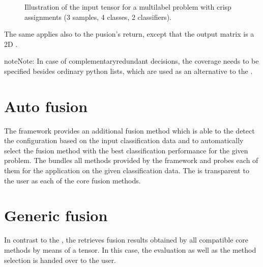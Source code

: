 \documentclass[letterpaper,10pt,english]{sphinxmanual}
\begin{document}
\begin{figure}[htbp]
\centering
\capstart

\noindent{}
\caption{Illustration of the input tensor for a multilabel problem with crisp assignments
(3 samples, 4 classes, 2 classifiers).}\label{\detokenize{overview:id2}}\label{\detokenize{overview:fig-input-tensor-illustration}}\end{figure}

\sphinxAtStartPar
The same applies also to the pusion’s return, except that the output matrix is a 2D .

\begin{sphinxadmonition}{note}{Note:}
\sphinxAtStartPar
In case of complementary\sphinxhyphen{}redundant decisions, the coverage needs to be specified besides ordinary python lists,
which are used as an alternative to the .
\end{sphinxadmonition}


\section{Auto fusion}
\label{\detokenize{overview:auto-fusion}}
\sphinxAtStartPar
The framework provides an additional fusion method {\hyperref[\detokenize{pusion.auto.auto_combiner:ac-cref}]{}} which is able to the detect the configuration
based on the input classification data and to automatically select the fusion method with the best classification
performance for the given problem.
The  bundles all methods provided by the framework and probes each of them for the application on the
given classification data.
The  is transparent to the user as each of the core fusion methods.


\section{Generic fusion}
\label{\detokenize{overview:generic-fusion}}
\sphinxAtStartPar
In contrast to the , the {\hyperref[\detokenize{pusion.auto.generic_combiner:gc-cref}]{}} retrieves fusion results obtained by all
compatible core methods by means of a  tensor. In this case, the evaluation as well as the method
selection is handed over to the user.
\end{document}
